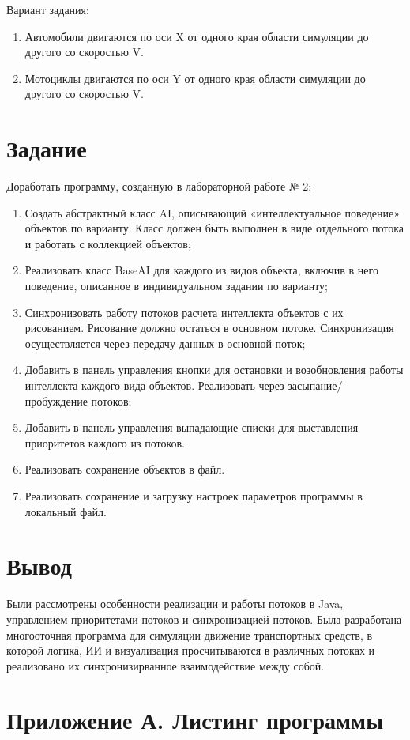\documentclass{article}
\begin{document}
Вариант задания:
\begin{enumerate}
\item Автомобили двигаются по оси X от одного края области симуляции до другого со скоростью V.
\item Мотоциклы двигаются по оси Y от одного края области симуляции до другого со скоростью V.
\end{enumerate}
\section*{Задание}

Доработать программу, созданную в лабораторной работе № 2:
\begin{enumerate}

\item Создать абстрактный класс AI, описывающий «интеллектуальное поведение» объектов по варианту. Класс должен быть выполнен в виде отдельного потока и работать с коллекцией объектов;
\item Реализовать класс BaseAI для каждого из видов объекта, включив в него поведение, описанное в индивидуальном задании по варианту;
\item Синхронизовать работу потоков расчета интеллекта объектов с их рисованием. Рисование должно остаться в основном потоке. Синхронизация осуществляется через передачу данных в основной поток;
\item Добавить в панель управления кнопки для остановки и возобновления работы интеллекта каждого вида объектов. Реализовать через засыпание/пробуждение потоков;
\item Добавить в панель управления выпадающие списки для выставления приоритетов каждого из потоков.
\item Реализовать сохранение объектов в файл.
\item Реализовать сохранение и загрузку настроек параметров программы в локальный файл.

\end{enumerate}

\section*{Вывод}
Были рассмотрены особенности реализации и работы потоков в Java, управлением приоритетами потоков и синхронизацией потоков.
Была разработана многооточная программа для симуляции движение транспортных средств, в которой логика, ИИ и визуализация
просчитываются в различных потоках и реализовано их синхронизирванное взаимодействие между собой.

\section*{Приложение А. Листинг программы}

\end{document}
